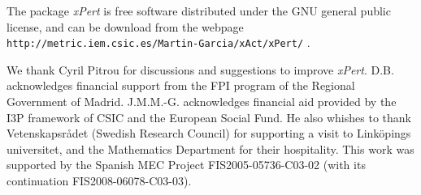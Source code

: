 \documentclass[aps,prd,showpacs]{revtex4}
\newcommand{\xPert}{{\em \lowercase{x}P\lowercase{ert}}}
\begin{document}
The package \xPert\/ is free software distributed under the GNU
general public license, and can be download from the webpage
{\tt http://metric.iem.csic.es/Martin-Garcia/xAct/xPert/} .

\acknowledgments

We thank Cyril Pitrou for discussions and suggestions to
improve \xPert.
D.B. acknowledges financial support from the FPI
program of the Regional Government of Madrid.
J.M.M.-G. acknowledges financial aid provided by the
I3P framework of CSIC and the European Social Fund.
He also whishes to thank Vetenskapsr\aa det (Swedish Research
Council) for supporting a visit to Link\"opings universitet,
and the Mathematics Department for their hospitality.
This work was supported by the Spanish MEC Project
FIS2005-05736-C03-02 (with its continuation FIS2008-06078-C03-03).
\end{document}

